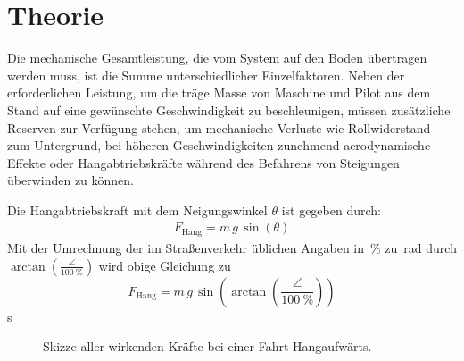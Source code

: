 \chapter{Theorie}\label{sec:theory}
	Die mechanische Gesamtleistung, die vom System auf den Boden übertragen werden muss, ist die Summe unterschiedlicher Einzelfaktoren.
	Neben der erforderlichen Leistung, um die träge Masse von Maschine und Pilot aus dem Stand auf eine gewünschte Geschwindigkeit zu beschleunigen, müssen zusätzliche Reserven zur Verfügung stehen, um mechanische Verluste wie Rollwiderstand zum Untergrund, bei höheren Geschwindigkeiten zunehmend aerodynamische Effekte oder Hangabtriebskräfte während des Befahrens von Steigungen überwinden zu können.\par\medskip
	Die Hangabtriebskraft mit dem Neigungswinkel \(\theta\) ist gegeben durch:
	\begin{align}
		F_\text{Hang} = m \, g \, \sin\!\left(\theta\right)
		\label{eq:downhill force}
	\end{align}%
	Mit der Umrechnung der im Straßenverkehr üblichen Angaben in~\unit{\percent} zu~\unit{\radian} durch \(\arctan\!\left(\frac{\angle}{\qty{100}{\percent}}\right)\) wird obige Gleichung zu
	\begin{equation}
		F_\text{Hang} = m \, g \, \sin\!\left(\arctan\!\left(\frac{\angle}{\qty{100}{\percent}}\right)\right)
		\label{eq:downhill force incline to radian}
	\end{equation}s
	\begin{figure}[h]
		\centering
		
		\caption[Skizze aller wirkenden Kräfte bei einer Fahrt Hangaufwärts]{Skizze aller wirkenden Kräfte bei einer Fahrt Hangaufwärts.}%
		\label{fig:sketch torque incline}
	\end{figure}

